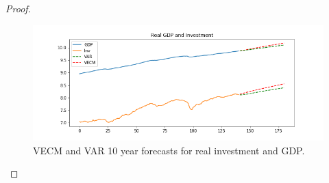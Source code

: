 \documentclass[oneside,reqno]{amsart}
\theoremstyle{definition}
\begin{document}
\begin{enumerate}[label=(\roman*)]
\begin{proof}
\begin{figure}
\includegraphics[width=\textwidth]{q2-real}
\caption{VECM and VAR 10 year forecasts for real investment and GDP.}
\label{q2-real}
\end{figure}

\end{proof}
\end{enumerate}
\end{document}
